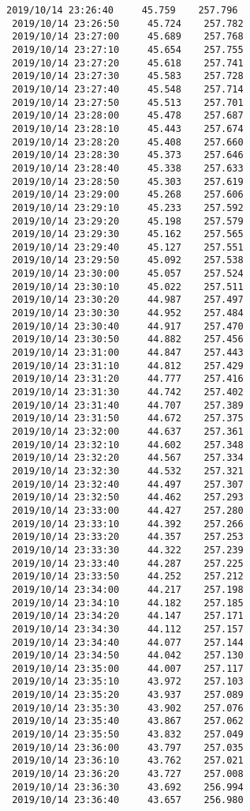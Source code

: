 \documentclass[11pt]{article}
\begin{document}
\begin{Verbatim}[commandchars=\\\{\}]
 2019/10/14 23:26:40     45.759    257.796
 2019/10/14 23:26:50     45.724    257.782
 2019/10/14 23:27:00     45.689    257.768
 2019/10/14 23:27:10     45.654    257.755
 2019/10/14 23:27:20     45.618    257.741
 2019/10/14 23:27:30     45.583    257.728
 2019/10/14 23:27:40     45.548    257.714
 2019/10/14 23:27:50     45.513    257.701
 2019/10/14 23:28:00     45.478    257.687
 2019/10/14 23:28:10     45.443    257.674
 2019/10/14 23:28:20     45.408    257.660
 2019/10/14 23:28:30     45.373    257.646
 2019/10/14 23:28:40     45.338    257.633
 2019/10/14 23:28:50     45.303    257.619
 2019/10/14 23:29:00     45.268    257.606
 2019/10/14 23:29:10     45.233    257.592
 2019/10/14 23:29:20     45.198    257.579
 2019/10/14 23:29:30     45.162    257.565
 2019/10/14 23:29:40     45.127    257.551
 2019/10/14 23:29:50     45.092    257.538
 2019/10/14 23:30:00     45.057    257.524
 2019/10/14 23:30:10     45.022    257.511
 2019/10/14 23:30:20     44.987    257.497
 2019/10/14 23:30:30     44.952    257.484
 2019/10/14 23:30:40     44.917    257.470
 2019/10/14 23:30:50     44.882    257.456
 2019/10/14 23:31:00     44.847    257.443
 2019/10/14 23:31:10     44.812    257.429
 2019/10/14 23:31:20     44.777    257.416
 2019/10/14 23:31:30     44.742    257.402
 2019/10/14 23:31:40     44.707    257.389
 2019/10/14 23:31:50     44.672    257.375
 2019/10/14 23:32:00     44.637    257.361
 2019/10/14 23:32:10     44.602    257.348
 2019/10/14 23:32:20     44.567    257.334
 2019/10/14 23:32:30     44.532    257.321
 2019/10/14 23:32:40     44.497    257.307
 2019/10/14 23:32:50     44.462    257.293
 2019/10/14 23:33:00     44.427    257.280
 2019/10/14 23:33:10     44.392    257.266
 2019/10/14 23:33:20     44.357    257.253
 2019/10/14 23:33:30     44.322    257.239
 2019/10/14 23:33:40     44.287    257.225
 2019/10/14 23:33:50     44.252    257.212
 2019/10/14 23:34:00     44.217    257.198
 2019/10/14 23:34:10     44.182    257.185
 2019/10/14 23:34:20     44.147    257.171
 2019/10/14 23:34:30     44.112    257.157
 2019/10/14 23:34:40     44.077    257.144
 2019/10/14 23:34:50     44.042    257.130
 2019/10/14 23:35:00     44.007    257.117
 2019/10/14 23:35:10     43.972    257.103
 2019/10/14 23:35:20     43.937    257.089
 2019/10/14 23:35:30     43.902    257.076
 2019/10/14 23:35:40     43.867    257.062
 2019/10/14 23:35:50     43.832    257.049
 2019/10/14 23:36:00     43.797    257.035
 2019/10/14 23:36:10     43.762    257.021
 2019/10/14 23:36:20     43.727    257.008
 2019/10/14 23:36:30     43.692    256.994
 2019/10/14 23:36:40     43.657    256.980

\end{Verbatim}
\end{document}
